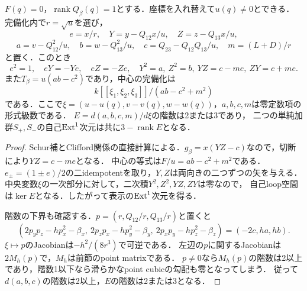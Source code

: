 \begin{lemma}[階数一の点の局所表示]
\label{lem:beta-local-schur}
$F(q)=0$，$\operatorname{rank}Q_\beta(q)=1$とする．座標を入れ替えて$u(q)\ne0$とできる．
完備化内で$r=\sqrt u$を選び，
\[
 e=x/r,\quad Y=y-Q_{12}x/u,\quad Z=z-Q_{13}x/u,
\]
\[
 a=v-Q_{12}^2/u,\quad b=w-Q_{13}^2/u,\quad
 c=Q_{23}-Q_{12}Q_{13}/u,\quad m=(L+D)/r
\]
と置く．このとき
\[
 e^2=1,\quad eY=-Ye,\quad eZ=-Ze,\quad
 Y^2=a,\ Z^2=b,\ YZ=c-me,\ ZY=c+me.
\]
また$T_\beta=u(ab-c^2)$であり，中心の完備化は
\[
 k[[\xi_1,\xi_2,\xi_3]]/(ab-c^2+m^2)
\]
である．ここで$\xi=(u-u(q),v-v(q),w-w(q))$，$a,b,c,m$は零定数項の形式級数である．
$E=d(a,b,c,m)/d\xi$の階数は2または3であり，
二つの単純加群$S_+,S_-$の自己$\operatorname{Ext}^1$次元は共に$3-\operatorname{rank}E$となる．
\end{lemma}
\begin{proof}
Schur補とClifford関係の直接計算による．$g_\beta=x(YZ-c)$なので，切断により$YZ=c-me$となる．
中心の等式は$F/u=ab-c^2+m^2$である．
$e_\pm=(1\pm e)/2$の二idempotentを取り，$Y,Z$は両向きの二つずつの矢を与える．
中央変数$\xi$の一次部分に対して，二次積$Y^2,Z^2,YZ,ZY$は零なので，
自己loop空間は$\ker E$となる．したがって表示の$\operatorname{Ext}^1$次元を得る．

階数の下界も確認する．$p=(r,Q_{12}/r,Q_{13}/r)$と置くと
\[
 (2p_yp_z-hp_x^2-\beta_x,\ 2p_zp_x-hp_y^2-\beta_y,\ 2p_xp_y-hp_z^2-\beta_z)
 =(-2c,ha,hb).
\]
$\xi\mapsto p$のJacobianは$-h^2/(8r^3)$で可逆である．
左辺の$p$に関するJacobianは$2M_h(p)$で，$M_h$は前節のpoint matrixである．
$p\ne0$なら$M_h(p)$の階数は2以上であり，階数1以下なら滑らかなpoint cubicの勾配も零となってしまう．
従って$d(a,b,c)$の階数は2以上，$E$の階数は2または3となる．
\end{proof}

